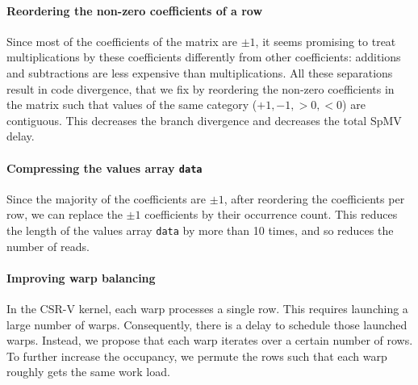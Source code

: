 \documentclass[runningheads,orivec]{llncs}
\begin{document}
\paragraph{\bf Reordering the non-zero coefficients of a row}
\label{Reordering non-zeros}
Since most of the coefficients of the matrix are $\pm1$, it seems promising to treat multiplications by these coefficients differently from other coefficients: additions and subtractions are less expensive than multiplications. All these separations result in code divergence, that we fix by reordering the non-zero coefficients in the matrix such that values of the same category ($+1, -1, >0, <0$) are contiguous. This decreases the branch divergence and decreases the total SpMV delay.  

\paragraph{\bf Compressing the values array \texttt{data}}
Since the majority of the coefficients are $\pm1$, after reordering the coefficients per row, we can replace the $\pm1$ coefficients by their occurrence count. This reduces the length of the values array \texttt{data} by more than 10 times, and so reduces the number of reads. 

\paragraph{\bf Improving warp balancing}
In the CSR-V kernel, each warp processes a single row. This requires launching a large number of warps. Consequently, there is a delay to schedule those launched warps. Instead, we propose that each warp iterates over a certain number of rows. To further increase the occupancy, we permute the rows such that each warp roughly gets the same work load.

\vspace*{-0.25cm}
\end{document}
